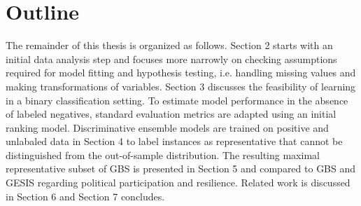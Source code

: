 \section{Outline}

The remainder of this thesis is organized as follows. Section 2 starts with an initial data analysis step and focuses more narrowly on checking assumptions required for model fitting and hypothesis testing, i.e. handling missing values and making transformations of variables. Section 3 discusses the feasibility of learning in a binary classification setting. To estimate model performance in the absence of labeled negatives, standard evaluation metrics are adapted using an initial ranking model. Discriminative ensemble models are trained on positive and unlabaled data in Section 4 to label instances as representative that cannot be distinguished from the out-of-sample distribution. The resulting maximal representative subset of GBS is presented in Section 5 and compared to GBS and GESIS regarding political participation and resilience. Related work is discussed in Section 6 and Section 7 concludes.
